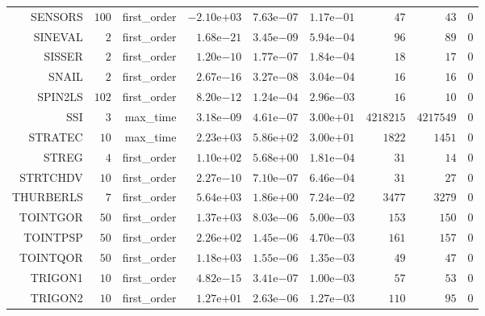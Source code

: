 \begin{longtable}{rrrrrrrrr}
SENSORS & \(   100\) & first\_order & \(-2.10\)e\(+03\) & \( 7.63\)e\(-07\) & \( 1.17\)e\(-01\) & \(    47\) & \(    43\) & \(     0\) \\
SINEVAL & \(     2\) & first\_order & \( 1.68\)e\(-21\) & \( 3.45\)e\(-09\) & \( 5.94\)e\(-04\) & \(    96\) & \(    89\) & \(     0\) \\
SISSER & \(     2\) & first\_order & \( 1.20\)e\(-10\) & \( 1.77\)e\(-07\) & \( 1.84\)e\(-04\) & \(    18\) & \(    17\) & \(     0\) \\
SNAIL & \(     2\) & first\_order & \( 2.67\)e\(-16\) & \( 3.27\)e\(-08\) & \( 3.04\)e\(-04\) & \(    16\) & \(    16\) & \(     0\) \\
SPIN2LS & \(   102\) & first\_order & \( 8.20\)e\(-12\) & \( 1.24\)e\(-04\) & \( 2.96\)e\(-03\) & \(    16\) & \(    10\) & \(     0\) \\
SSI & \(     3\) & max\_time & \( 3.18\)e\(-09\) & \( 4.61\)e\(-07\) & \( 3.00\)e\(+01\) & \(4218215\) & \(4217549\) & \(     0\) \\
STRATEC & \(    10\) & max\_time & \( 2.23\)e\(+03\) & \( 5.86\)e\(+02\) & \( 3.00\)e\(+01\) & \(  1822\) & \(  1451\) & \(     0\) \\
STREG & \(     4\) & first\_order & \( 1.10\)e\(+02\) & \( 5.68\)e\(+00\) & \( 1.81\)e\(-04\) & \(    31\) & \(    14\) & \(     0\) \\
STRTCHDV & \(    10\) & first\_order & \( 2.27\)e\(-10\) & \( 7.10\)e\(-07\) & \( 6.46\)e\(-04\) & \(    31\) & \(    27\) & \(     0\) \\
THURBERLS & \(     7\) & first\_order & \( 5.64\)e\(+03\) & \( 1.86\)e\(+00\) & \( 7.24\)e\(-02\) & \(  3477\) & \(  3279\) & \(     0\) \\
TOINTGOR & \(    50\) & first\_order & \( 1.37\)e\(+03\) & \( 8.03\)e\(-06\) & \( 5.00\)e\(-03\) & \(   153\) & \(   150\) & \(     0\) \\
TOINTPSP & \(    50\) & first\_order & \( 2.26\)e\(+02\) & \( 1.45\)e\(-06\) & \( 4.70\)e\(-03\) & \(   161\) & \(   157\) & \(     0\) \\
TOINTQOR & \(    50\) & first\_order & \( 1.18\)e\(+03\) & \( 1.55\)e\(-06\) & \( 1.35\)e\(-03\) & \(    49\) & \(    47\) & \(     0\) \\
TRIGON1 & \(    10\) & first\_order & \( 4.82\)e\(-15\) & \( 3.41\)e\(-07\) & \( 1.00\)e\(-03\) & \(    57\) & \(    53\) & \(     0\) \\
TRIGON2 & \(    10\) & first\_order & \( 1.27\)e\(+01\) & \( 2.63\)e\(-06\) & \( 1.27\)e\(-03\) & \(   110\) & \(    95\) & \(     0\) \\

\end{longtable}
